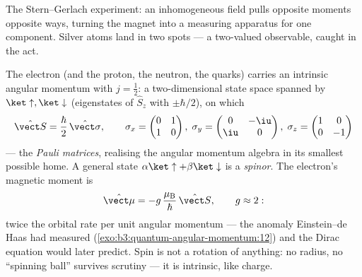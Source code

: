 \begin{omfigure}

{\small The Stern--Gerlach experiment: an inhomogeneous field pulls
opposite moments opposite ways, turning the magnet into a measuring
apparatus for one  component. Silver atoms land in two spots ---
a two-valued observable, caught in the act.}
\end{omfigure}

\begin{definition}\label{def:b3:spin-two-level:spin}
The electron (and the proton, the neutron, the quarks) carries an
intrinsic angular momentum with $j = \tfrac12$: a two-dimensional
state space spanned by $\ket\uparrow, \ket\downarrow$ (eigenstates
of $\hat S_z$ with $\pm\hbar/2$), on which
\[
\hat{\vect S} = \frac\hbar2\,\hat{\vect\sigma} , \qquad
\sigma_x = \begin{pmatrix}0&1\\1&0\end{pmatrix} ,\;
\sigma_y = \begin{pmatrix}0&-\iu\\\iu&0\end{pmatrix} ,\;
\sigma_z = \begin{pmatrix}1&0\\0&-1\end{pmatrix}
\]
--- the \emph{Pauli matrices}, realising the angular momentum
algebra in its smallest possible home. A general state
$\alpha\ket\uparrow + \beta\ket\downarrow$ is a \emph{spinor}. The
electron's magnetic moment is
\[
\hat{\vect\mu} = -g\,\frac{\mu_{\text{B}}}{\hbar}\,\hat{\vect S} ,
\qquad g \approx 2 :
\]
twice the orbital rate per unit angular momentum --- the anomaly
Einstein--de Haas had measured
(\cref{exo:b3:quantum-angular-momentum:12}) and the Dirac equation
would later predict. Spin is not a rotation of anything: no radius,
no ``spinning ball'' survives scrutiny --- it is intrinsic, like
charge.
\end{definition}

